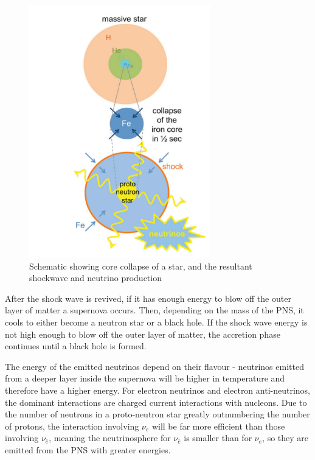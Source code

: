 \begin{figure}
    \centering
    \includegraphics[width=0.7\textwidth]{Figures/ccsn_mechanism.png}
    \caption{Schematic showing core collapse of a star, and the resultant shockwave and neutrino production}
    \label{fig:ccsn_mechanism}
\end{figure}

After the shock wave is revived, if it has enough energy to blow off the outer layer of matter a supernova occurs. Then, depending on the mass of the PNS, it cools to either become a neutron star or a black hole. If the shock wave energy is not high enough to blow off the outer layer of matter, the accretion phase continues until a black hole is formed.
\newline

The energy of the emitted neutrinos depend on their flavour - neutrinos emitted from a deeper layer inside the supernova will be higher in temperature and therefore have a higher energy. For electron neutrinos and electron anti-neutrinos, the dominant interactions are charged current interactions with nucleons. Due to the number of neutrons in a proto-neutron star greatly outnumbering the number of protons, the interaction involving $\nu_{e}$ will be far more efficient than those involving $\nu_{\bar{e}}$, meaning the neutrinosphere for $\nu_{\bar{e}}$ is smaller than for $\nu_{e}$, so they are emitted from the PNS with greater energies. 


